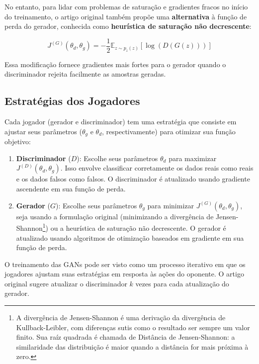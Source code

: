 \documentclass{article}
\begin{document}
No entanto, para lidar com problemas de saturação e gradientes fracos no início do treinamento, o artigo original também propõe uma \textbf{alternativa} à função de perda do gerador, conhecida como \textbf{heurística de saturação não decrescente}:

\begin{equation}
    J^{(G)}(\theta_d, \theta_g) = - \frac{1}{2} \mathbb{E}_{z \sim p_z(z)} \left[ \log (D(G(z))) \right]
\end{equation}

Essa modificação fornece gradientes mais fortes para o gerador quando o discriminador rejeita facilmente as amostras geradas.

\subsection{Estratégias dos Jogadores}

Cada jogador (gerador e discriminador) tem uma estratégia que consiste em ajustar seus parâmetros ($\theta_g$ e $\theta_d$, respectivamente) para otimizar sua função objetivo:

\begin{enumerate}
    \item \textbf{Discriminador} ($D$): Escolhe seus parâmetros $\theta_d$ para maximizar $J^{(D)}(\theta_d, \theta_g)$. Isso envolve classificar corretamente os dados reais como reais e os dados falsos como falsos. O discriminador é atualizado usando gradiente ascendente em sua função de perda.
    \item \textbf{Gerador} ($G$): Escolhe seus parâmetros $\theta_g$ para minimizar $J^{(G)}(\theta_d, \theta_g)$, seja usando a formulação original (minimizando a divergência de Jensen-Shannon\footnote{A divergência de Jensen-Shannon é uma derivação da divergência de Kullback-Leibler, com diferenças sutis como o resultado ser sempre um valor finito. Sua raíz quadrada é chamada de Distância de Jensen-Shannon: a similaridade das distribuição é maior quando a distância for mais próxima à zero.}) ou a heurística de saturação não decrescente. O gerador é atualizado usando algoritmos de otimização baseados em gradiente em sua função de perda.
\end{enumerate}

O treinamento das GANs pode ser visto como um processo iterativo em que os jogadores ajustam suas estratégias em resposta às ações do oponente. O artigo original sugere atualizar o discriminador $k$ vezes para cada atualização do gerador.
\end{document}
